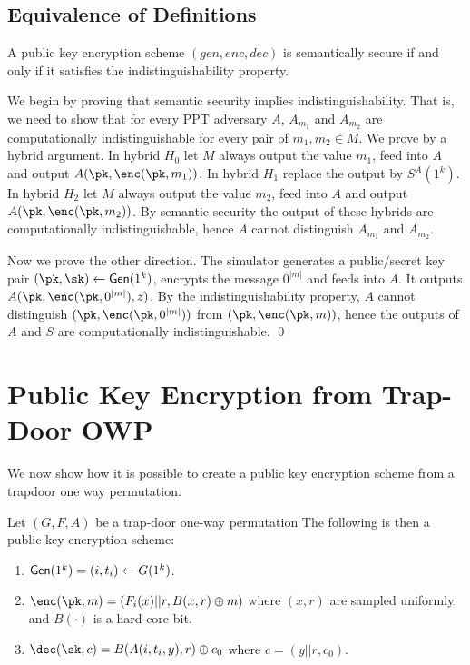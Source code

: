 \documentclass[12pt]{tufte-book}
\begin{document}
\subsection{Equivalence of Definitions}

\begin{theorem}
A public key encryption scheme $(gen, enc, dec)$ is semantically secure if and only if
it satisfies the indistinguishability property.
\end{theorem}

\proof
We begin by proving that semantic security implies indistinguishability.
That is, we need to show that for every PPT adversary $A$, $A_{m_1}$ and $A_{m_2}$ are computationally indistinguishable for every pair of $m_1, m_2 \in M$.
We prove by a hybrid argument.
In hybrid $H_0$ let $M$ always output the value $m_1$, feed into $A$ and output $A(\pk, \enc(\pk, m_1))$.
In hybrid $H_1$ replace the output by $S^A(1^k)$.
In hybrid $H_2$ let $M$ always output the value $m_2$, feed into $A$ and output $A(\pk, \enc(\pk, m_2))$.
By semantic security the output of these hybrids are computationally indistinguishable, hence $A$ cannot distinguish $A_{m_1}$ and $A_{m_2}$.



Now we prove the other direction.
The simulator generates a public/secret key pair $(\pk, \sk) \gets \gen(1^k)$, encrypts the message $0^{|m|}$ and feeds into $A$.
It outputs $A(\pk, \enc(\pk, 0^{|m|}), z)$.
By the indistinguishability property, $A$ cannot distinguish $(\pk, \enc(\pk, 0^{|m|}))$ from $(\pk, \enc(\pk, m))$, hence the outputs of $A$ and $S$ are computationally indistinguishable.
 \qed


\section{Public Key Encryption from Trap-Door OWP}

We now show how it is possible to create a public key encryption scheme from a trapdoor
one way permutation.

\begin{theorem}
Let $(G,F,A)$ be a trap-door one-way permutation The following is then a public-key
encryption scheme:
\begin{enumerate}
\item $\mathsf{Gen}(1^k) = (i,t_i) \gets G(1^k)$.
\item $\enc(\pk, m) = (F_i(x) || r, B(x, r) \oplus m)$ where $(x,r)$ are sampled uniformly, and $B(\cdot)$ is a hard-core bit.
\item $\dec(\sk, c) = B(A(i,t_i, y), r) \oplus c_0$ where $c = (y||r,c_0)$.
\end{enumerate}

\end{theorem}
\end{document}
